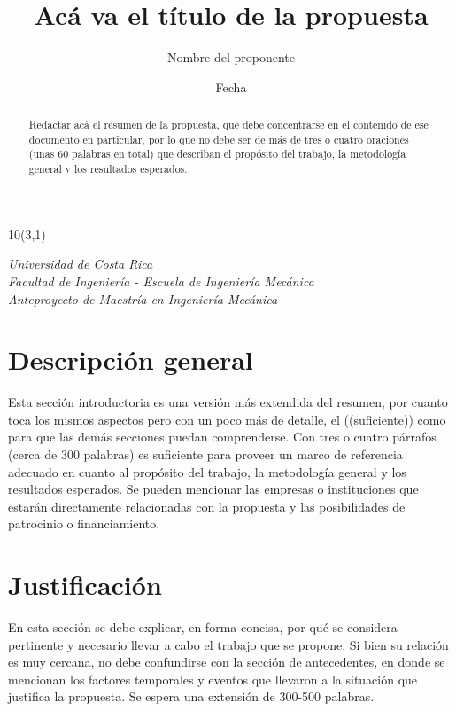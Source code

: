 \documentclass[letterpaper,11pt]{Proposal}
\title{Acá va el título de la propuesta}
\author{Nombre del proponente}
\date{Fecha}
\begin{document}
\begin{textblock}{10}(3,1)

\textit{Universidad de Costa Rica}\\
\textit{Facultad de Ingeniería - Escuela de Ingeniería Mecánica}\\
\textit{Anteproyecto de Maestría en Ingeniería Mecánica}

\end{textblock}

\maketitle

\begin{abstract}
Redactar acá el resumen de la propuesta, que debe concentrarse en el contenido de ese documento en particular, por lo que no debe ser de más de tres o cuatro oraciones (unas 60 palabras en total) que describan el propósito del trabajo, la metodología general y los resultados esperados.

\end{abstract}

\section{Descripción general}

Esta sección introductoria es una versión más extendida del resumen, por cuanto toca los mismos aspectos pero con un poco más de detalle, el ((suficiente)) como para que las demás secciones puedan comprenderse. Con tres o cuatro párrafos (cerca de 300 palabras) es suficiente para proveer un marco de referencia adecuado en cuanto al propósito del trabajo, la metodología general y los resultados esperados. Se pueden mencionar las empresas o instituciones que estarán directamente relacionadas con la propuesta y las posibilidades de patrocinio o financiamiento.


\section{Justificación}
En esta sección se debe explicar, en forma concisa, por qué se considera pertinente y necesario llevar a cabo el trabajo que se propone. Si bien su relación es muy cercana, no debe confundirse con la sección de antecedentes, en donde se mencionan los factores temporales y eventos que llevaron a la situación que justifica la propuesta. Se espera una extensión de 300-500 palabras.
\end{document}
